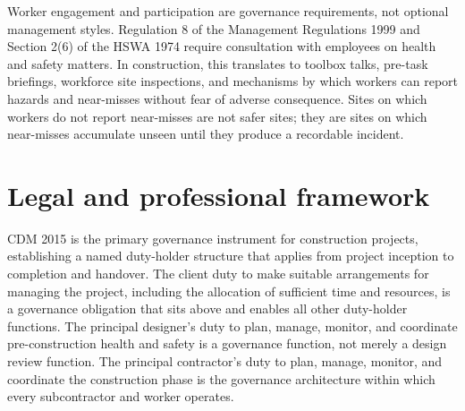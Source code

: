 Worker engagement and participation are governance requirements, not optional management styles. Regulation 8 of the Management Regulations 1999 and Section 2(6) of the HSWA 1974 require consultation with employees on health and safety matters. In construction, this translates to toolbox talks, pre-task briefings, workforce site inspections, and mechanisms by which workers can report hazards and near-misses without fear of adverse consequence. Sites on which workers do not report near-misses are not safer sites; they are sites on which near-misses accumulate unseen until they produce a recordable incident.



\section{Legal and professional framework}

CDM 2015 is the primary governance instrument for construction projects, establishing a named duty-holder structure that applies from project inception to completion and handover. The client duty to make suitable arrangements for managing the project, including the allocation of sufficient time and resources, is a governance obligation that sits above and enables all other duty-holder functions. The principal designer's duty to plan, manage, monitor, and coordinate pre-construction health and safety is a governance function, not merely a design review function. The principal contractor's duty to plan, manage, monitor, and coordinate the construction phase is the governance architecture within which every subcontractor and worker operates.

